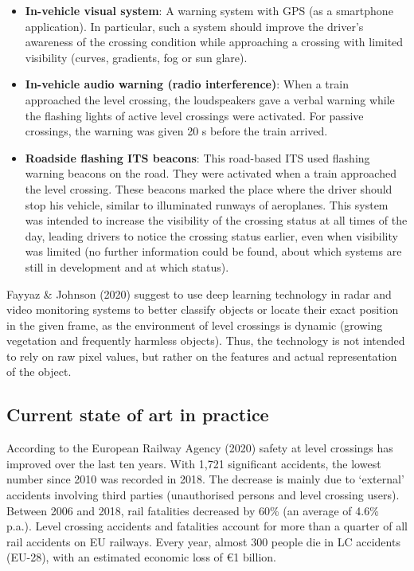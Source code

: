 \documentclass[
]{book}
\providecommand{\tightlist}{%
  \setlength{\itemsep}{0pt}\setlength{\parskip}{0pt}}
\begin{document}
\begin{itemize}
\tightlist
\item
  \textbf{In-vehicle visual system}: A warning system with GPS (as a smartphone application). In particular, such a system should improve the driver's awareness of the crossing condition while approaching a crossing with limited visibility (curves, gradients, fog or sun glare).
\item
  \textbf{In-vehicle audio warning (radio interference)}: When a train approached the level crossing, the loudspeakers gave a verbal warning while the flashing lights of active level crossings were activated. For passive crossings, the warning was given 20 s before the train arrived.
\item
  \textbf{Roadside flashing ITS beacons}: This road-based ITS used flashing warning beacons on the road. They were activated when a train approached the level crossing. These beacons marked the place where the driver should stop his vehicle, similar to illuminated runways of aeroplanes. This system was intended to increase the visibility of the crossing status at all times of the day, leading drivers to notice the crossing status earlier, even when visibility was limited (no further information could be found, about which systems are still in development and at which status).
\end{itemize}

Fayyaz \& Johnson (2020) suggest to use deep learning technology in radar and video monitoring systems to better classify objects or locate their exact position in the given frame, as the environment of level crossings is dynamic (growing vegetation and frequently harmless objects). Thus, the technology is not intended to rely on raw pixel values, but rather on the features and actual representation of the object.

\hypertarget{current-state-of-art-in-practice-1}{%
\subsection*{Current state of art in practice}\label{current-state-of-art-in-practice-1}}

According to the European Railway Agency (2020) safety at level crossings has improved over the last ten years. With 1,721 significant accidents, the lowest number since 2010 was recorded in 2018. The decrease is mainly due to `external' accidents involving third parties (unauthorised persons and level crossing users). Between 2006 and 2018, rail fatalities decreased by 60\% (an average of 4.6\% p.a.). Level crossing accidents and fatalities account for more than a quarter of all rail accidents on EU railways. Every year, almost 300 people die in LC accidents (EU-28), with an estimated economic loss of €1 billion.
\end{document}
